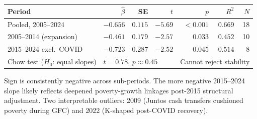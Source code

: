 
\begin{tabular}{lrrrrrr}
\toprule
Period & $\hat{\beta}$ & SE & $t$ & $p$ & $R^2$ & $N$ \\
\midrule
    Pooled, 2005--2024 & $-0.656$ & $0.115$ & $-5.69$ & $<0.001$ & $0.669$ & 18 \\
    2005--2014 (expansion) & $-0.461$ & $0.179$ & $-2.57$ & $0.033$ & $0.452$ & 10 \\
    2015--2024 excl.\ COVID & $-0.723$ & $0.287$ & $-2.52$ & $0.045$ & $0.514$ & 8 \\
    Chow test ($H_0$: equal slopes) & \multicolumn{3}{l}{$t=0.78$, $p\approx0.45$} &
        \multicolumn{3}{l}{Cannot reject stability} \\
\bottomrule
\end{tabular}
\begin{tablenotes}
\small Sign is consistently negative across sub-periods. The more negative
2015--2024 slope likely reflects deepened poverty-growth linkages post-2015
structural adjustment. Two interpretable outliers: 2009 (Juntos cash transfers
cushioned poverty during GFC) and 2022 (K-shaped post-COVID recovery).
\end{tablenotes}
